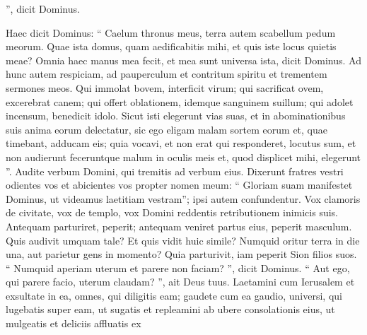 \begin{biblechapter}
\begin{biblechapter}
\begin{biblechapter}
\begin{biblechapter}
\begin{biblechapter}
\begin{biblechapter}
\begin{biblechapter}
\begin{biblechapter}
\begin{biblechapter}
\begin{biblechapter}
\begin{biblechapter}
\begin{biblechapter}
\begin{biblechapter}
\begin{biblechapter}
\begin{biblechapter}
\begin{biblechapter}
\begin{biblechapter}
\begin{biblechapter}
\begin{biblechapter}
\begin{biblechapter}
\begin{biblechapter}
\begin{biblechapter}
\begin{biblechapter}
\begin{biblechapter}
\begin{biblechapter}
\begin{biblechapter}
\begin{biblechapter}
\begin{biblechapter}
\begin{biblechapter}
\begin{biblechapter}
\begin{biblechapter}
\begin{biblechapter}
\begin{biblechapter}
\begin{biblechapter}
\begin{biblechapter}
\begin{biblechapter}
\begin{biblechapter}
\begin{biblechapter}
\begin{biblechapter}
\begin{biblechapter}
\begin{biblechapter}
\begin{biblechapter}
\begin{biblechapter}
\begin{biblechapter}
\begin{biblechapter}
\begin{biblechapter}
\begin{biblechapter}
\begin{biblechapter}
\begin{biblechapter}
\begin{biblechapter}
\begin{biblechapter}
\begin{biblechapter}
\begin{biblechapter}
\begin{biblechapter}
\begin{biblechapter}
\begin{biblechapter}
\begin{biblechapter}
\begin{biblechapter}
\begin{biblechapter}
\begin{biblechapter}
\begin{biblechapter}
\begin{biblechapter}
\begin{biblechapter}
\begin{biblechapter}
\begin{biblechapter}
”,
 dicit Dominus.
 
\begin{biblechapter}
\verse Haec dicit Dominus:
 “ Caelum thronus meus,
 terra autem scabellum pedum meorum.
 Quae ista domus, quam aedificabitis mihi,
 et quis iste locus quietis meae?
 \verse Omnia haec manus mea fecit,
 et mea sunt universa ista,
 dicit Dominus.
 Ad hunc autem respiciam,
 ad pauperculum et contritum spiritu
 et trementem sermones meos.
 \verse Qui immolat bovem, interficit virum;
 qui sacrificat ovem, excerebrat canem;
 qui offert oblationem, idemque sanguinem suillum;
 qui adolet incensum, benedicit idolo.
 Sicut isti elegerunt vias suas,
 et in abominationibus suis anima eorum delectatur,
 \verse sic ego eligam malam sortem eorum
 et, quae timebant, adducam eis;
 quia vocavi, et non erat qui responderet,
 locutus sum, et non audierunt
 feceruntque malum in oculis meis
 et, quod displicet mihi, elegerunt ”.
 \verse Audite verbum Domini,
 qui tremitis ad verbum eius.
 Dixerunt fratres vestri odientes vos
 et abicientes vos propter nomen meum:
 “ Gloriam suam manifestet Dominus,
 ut videamus laetitiam vestram”;
 ipsi autem confundentur.
 \verse Vox clamoris de civitate,
 vox de templo,
 vox Domini
 reddentis retributionem inimicis suis.
 \verse Antequam parturiret, peperit;
 antequam veniret partus eius, peperit masculum.
 \verse Quis audivit umquam tale?
 Et quis vidit huic simile?
 Numquid oritur terra in die una,
 aut parietur gens in momento?
 Quia parturivit, iam peperit Sion filios suos.
 \verse “ Numquid aperiam uterum et parere non faciam? ”,
 dicit Dominus.
 “ Aut ego, qui parere facio, uterum claudam? ”,
 ait Deus tuus.
 \verse Laetamini cum Ierusalem et exsultate in ea,
 omnes, qui diligitis eam;
 gaudete cum ea gaudio,
 universi, qui lugebatis super eam,
 \verse ut sugatis et repleamini
 ab ubere consolationis eius,
 ut mulgeatis et deliciis affluatis
 ex 
\end{biblechapter}
\end{biblechapter}
\end{biblechapter}
\end{biblechapter}
\end{biblechapter}
\end{biblechapter}
\end{biblechapter}
\end{biblechapter}
\end{biblechapter}
\end{biblechapter}
\end{biblechapter}
\end{biblechapter}
\end{biblechapter}
\end{biblechapter}
\end{biblechapter}
\end{biblechapter}
\end{biblechapter}
\end{biblechapter}
\end{biblechapter}
\end{biblechapter}
\end{biblechapter}
\end{biblechapter}
\end{biblechapter}
\end{biblechapter}
\end{biblechapter}
\end{biblechapter}
\end{biblechapter}
\end{biblechapter}
\end{biblechapter}
\end{biblechapter}
\end{biblechapter}
\end{biblechapter}
\end{biblechapter}
\end{biblechapter}
\end{biblechapter}
\end{biblechapter}
\end{biblechapter}
\end{biblechapter}
\end{biblechapter}
\end{biblechapter}
\end{biblechapter}
\end{biblechapter}
\end{biblechapter}
\end{biblechapter}
\end{biblechapter}
\end{biblechapter}
\end{biblechapter}
\end{biblechapter}
\end{biblechapter}
\end{biblechapter}
\end{biblechapter}
\end{biblechapter}
\end{biblechapter}
\end{biblechapter}
\end{biblechapter}
\end{biblechapter}
\end{biblechapter}
\end{biblechapter}
\end{biblechapter}
\end{biblechapter}
\end{biblechapter}
\end{biblechapter}
\end{biblechapter}
\end{biblechapter}
\end{biblechapter}
\end{biblechapter}
